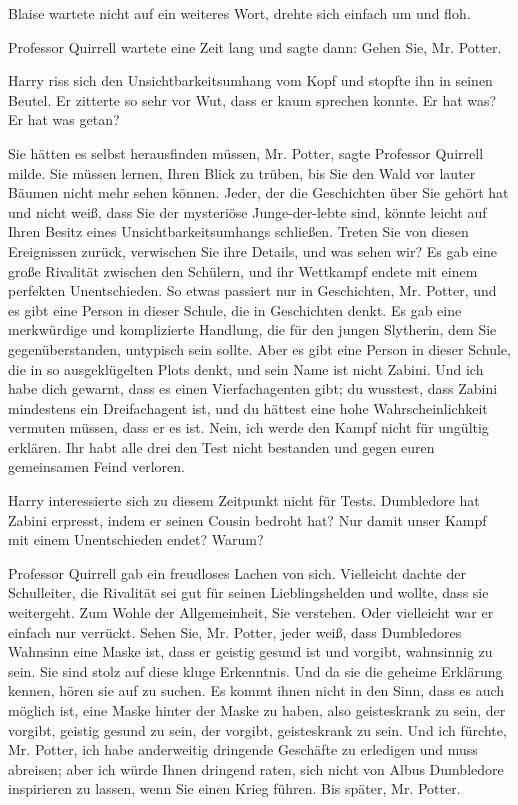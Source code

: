 Blaise wartete nicht auf ein weiteres Wort, drehte sich einfach um und floh.

Professor Quirrell wartete eine Zeit lang und sagte dann: \glqq{}Gehen Sie, Mr.
Potter.\grqq{}

Harry riss sich den Unsichtbarkeitsumhang vom Kopf und stopfte ihn in seinen
Beutel. Er zitterte so sehr vor Wut, dass er kaum sprechen konnte. \glqq{}Er hat
was? Er hat was getan?\grqq{}

\glqq{}Sie hätten es selbst herausfinden müssen, Mr. Potter\grqq{}, sagte
Professor Quirrell milde. \glqq{}Sie müssen lernen, Ihren Blick zu trüben, bis
Sie den Wald vor lauter Bäumen nicht mehr sehen können. Jeder, der die
Geschichten über Sie gehört hat und nicht weiß, dass Sie der mysteriöse
Junge-der-lebte sind, könnte leicht auf Ihren Besitz eines
Unsichtbarkeitsumhangs schließen. Treten Sie von diesen Ereignissen zurück,
verwischen Sie ihre Details, und was sehen wir? Es gab eine große Rivalität
zwischen den Schülern, und ihr Wettkampf endete mit einem perfekten
Unentschieden. So etwas passiert nur in Geschichten, Mr. Potter, und es gibt
eine Person in dieser Schule, die in Geschichten denkt. Es gab eine merkwürdige
und komplizierte Handlung, die für den jungen Slytherin, dem Sie
gegenüberstanden, untypisch sein sollte. Aber es gibt eine Person in dieser
Schule, die in so ausgeklügelten Plots denkt, und sein Name ist nicht Zabini.
Und ich habe dich gewarnt, dass es einen Vierfachagenten gibt; du wusstest, dass
Zabini mindestens ein Dreifachagent ist, und du hättest eine hohe
Wahrscheinlichkeit vermuten müssen, dass er es ist. Nein, ich werde den Kampf
nicht für ungültig erklären. Ihr habt alle drei den Test nicht bestanden und
gegen euren gemeinsamen Feind verloren.\grqq{}

Harry interessierte sich zu diesem Zeitpunkt nicht für Tests. \glqq{}Dumbledore
hat Zabini erpresst, indem er seinen Cousin bedroht hat? Nur damit unser Kampf
mit einem Unentschieden endet? Warum?\grqq{}

Professor Quirrell gab ein freudloses Lachen von sich. \glqq{}Vielleicht dachte
der Schulleiter, die Rivalität sei gut für seinen Lieblingshelden und wollte,
dass sie weitergeht. Zum Wohle der Allgemeinheit, Sie verstehen. Oder vielleicht
war er einfach nur verrückt. Sehen Sie, Mr. Potter, jeder weiß, dass Dumbledores
Wahnsinn eine Maske ist, dass er geistig gesund ist und vorgibt, wahnsinnig zu
sein. Sie sind stolz auf diese kluge Erkenntnis. Und da sie die geheime
Erklärung kennen, hören sie auf zu suchen. Es kommt ihnen nicht in den Sinn,
dass es auch möglich ist, eine Maske hinter der Maske zu haben, also
geisteskrank zu sein, der vorgibt, geistig gesund zu sein, der vorgibt,
geisteskrank zu sein. Und ich fürchte, Mr. Potter, ich habe anderweitig
dringende Geschäfte zu erledigen und muss abreisen; aber ich würde Ihnen
dringend raten, sich nicht von Albus Dumbledore inspirieren zu lassen, wenn Sie
einen Krieg führen. Bis später, Mr. Potter.\grqq{}

